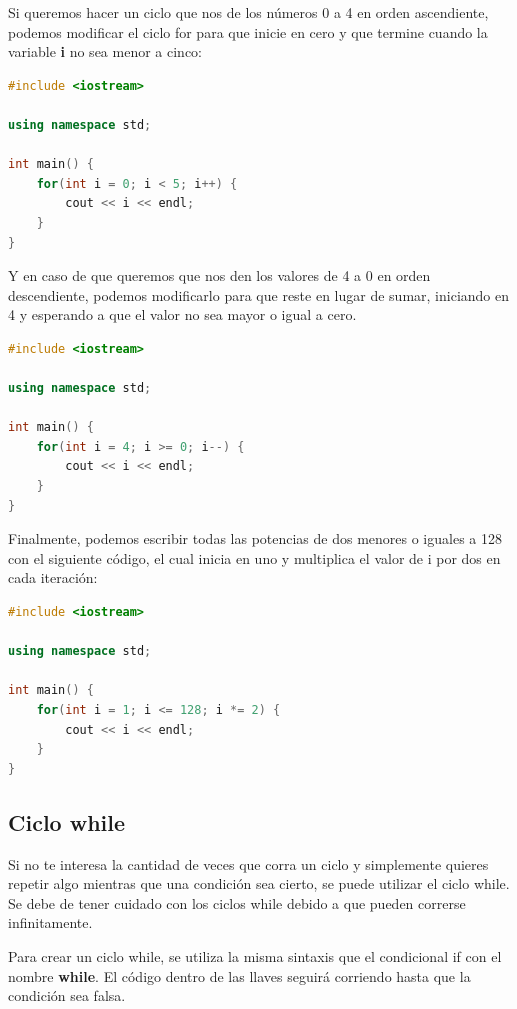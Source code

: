 \documentclass{article}
\begin{document}
Si queremos hacer un ciclo que nos de los números 0 a 4 en orden ascendiente, podemos modificar el ciclo for para que inicie en cero y que termine cuando la variable \textbf{i} no sea menor a cinco:

\begin{lstlisting}[language=C++, title=Ciclo for]
#include <iostream>

using namespace std;

int main() {
	for(int i = 0; i < 5; i++) {
		cout << i << endl;
	}
}
\end{lstlisting}

Y en caso de que queremos que nos den los valores de 4 a 0 en orden descendiente, podemos modificarlo para que reste en lugar de sumar, iniciando en 4 y esperando a que el valor no sea mayor o igual a cero.

\begin{lstlisting}[language=C++, title=Ciclo for]
#include <iostream>

using namespace std;

int main() {
	for(int i = 4; i >= 0; i--) {
		cout << i << endl;
	}
}
\end{lstlisting}

Finalmente, podemos escribir todas las potencias de dos menores o iguales a 128 con el siguiente código, el cual inicia en uno y multiplica el valor de i por dos en cada iteración:

\begin{lstlisting}[language=C++, title=Ciclo for]
#include <iostream>

using namespace std;

int main() {
	for(int i = 1; i <= 128; i *= 2) {
		cout << i << endl;
	}
}
\end{lstlisting}

\subsection{Ciclo while}

Si no te interesa la cantidad de veces que corra un ciclo y simplemente quieres repetir algo mientras que una condición sea cierto, se puede utilizar el ciclo while. Se debe de tener cuidado con los ciclos while debido a que pueden correrse infinitamente.

Para crear un ciclo while, se utiliza la misma sintaxis que el condicional if con el nombre \textbf{while}. El código dentro de las llaves seguirá corriendo hasta que la condición sea falsa.
\end{document}
